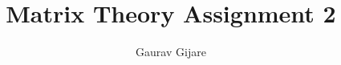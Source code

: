 \documentclass[journal,12pt,twocolumn]{IEEEtran}
\begin{document}
\makeatletter
{}
\makeatother
\let\StandardTheFigure\thefigure
\let\vec\mathbf
\renewcommand{\thefigure}{\theproblem}
\def\putbox#1#2#3{\makebox[0in][l]{\makebox[#1][l]{}\raisebox{\baselineskip}[0in][0in]{\raisebox{#2}[0in][0in]{#3}}}}
     \def\rightbox#1{\makebox[0in][r]{#1}}
     \def\centbox#1{\makebox[0in]{#1}}
     \def\topbox#1{\raisebox{-\baselineskip}[0in][0in]{#1}}
     \def\midbox#1{\raisebox{-0.5\baselineskip}[0in][0in]{#1}}
\vspace{3cm}
\title{Matrix Theory Assignment 2}
\author{Gaurav Gijare}
%
%
%
% 
%
\end{document}
